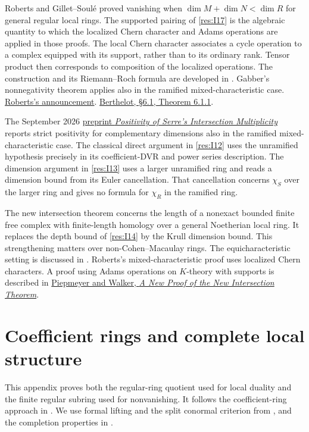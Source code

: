 \documentclass[11pt,oneside,openany]{book}
\renewcommand{\chaptermark}[1]{\markboth{\thechapter.\ #1}{}}
\theoremstyle{definition}
\theoremstyle{remark}
\begin{document}
Roberts and Gillet--Soul\'e proved vanishing when
\(\dim M+\dim N<\dim R\) for general regular local rings.
The supported pairing of \ref{res:I17} is the algebraic
quantity to which the localized Chern character and
Adams operations are applied in those proofs. The local
Chern character associates a cycle operation to a
complex equipped with its support, rather than to its
ordinary rank. Tensor product then corresponds to composition
of the localized operations. The construction and its
Riemann--Roch formula are developed in
\cite[Chapter 11 and \S 13.1]{roberts}.
Gabber's nonnegativity theorem applies also in the ramified
mixed-characteristic case.
\href{https://doi.org/10.1090/S0273-0979-1985-15394-7}{Roberts's announcement}.
\href{https://numdam.org/item/SB_1995-1996__38__273_0.pdf}{Berthelot,
\S 6.1, Theorem 6.1.1}.

The September 2026
\href{https://github.com/openai/math/blob/main/preprints/Positivity-of-Serres-Intersection-Multiplicity-September-23-2026/paper.pdf}{preprint
\emph{Positivity of Serre's Intersection Multiplicity}}
reports strict positivity for complementary dimensions
also in the ramified mixed-characteristic case. The classical
direct argument in \ref{res:I12} uses the unramified
hypothesis precisely in its coefficient-DVR and power series
description. The dimension argument in \ref{res:I13}
uses a larger unramified ring and reads a dimension bound
from its Euler cancellation. That cancellation concerns
\(\chi_S\) over the larger ring and gives no formula for
\(\chi_R\) in the ramified ring.

The new intersection theorem concerns the length of a
nonexact bounded finite free complex with finite-length
homology over a general Noetherian local ring. It replaces
the depth bound of \ref{res:I14} by the Krull dimension
bound. This strengthening matters over non-Cohen--Macaulay
rings. The equicharacteristic setting is discussed in
\cite[\S 9.4]{bruns}. Roberts's mixed-characteristic proof
uses localized Chern characters. A proof using Adams
operations on \(K\)-theory with supports is described in
\href{https://arxiv.org/abs/0706.0201}{Piepmeyer and Walker,
\emph{A New Proof of the New Intersection Theorem}}.
\appendix
\chapter{Coefficient rings and complete local structure}
\label{ch:coefficient-rings}
\renewcommand{\chaptermark}[1]{\markboth{\thechapter.\ #1}{}}

This appendix proves both the regular-ring quotient used for local
duality and the finite regular subring used for nonvanishing. It follows
the coefficient-ring approach in \cite[\S160]{st-alg}. We use
formal lifting and the split conormal criterion from
\cite[FL-01, FL-02, FL-07 and KD-17]{core}, and the completion
properties in \cite[ALG-05-C04-R02--R04 and S01]{p103}.
\end{document}
